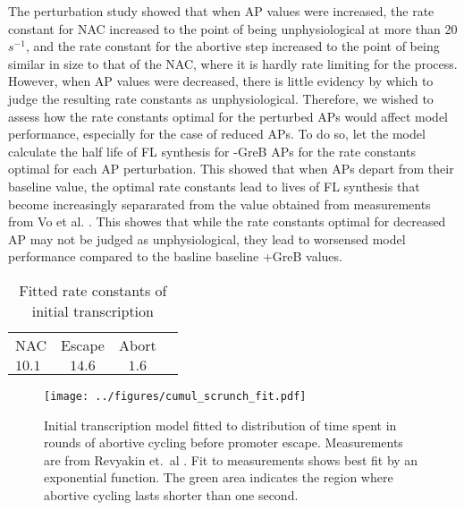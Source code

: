 The perturbation study showed that when AP values were increased,  the rate
constant for NAC increased to the point of being unphysiological at more than
20 $s^{-1}$, and the rate constant for the abortive step increased to the
point of being similar in size to that of the NAC, where it is hardly rate
limiting for the process. However, when AP values were decreased, there is
little evidency by which to judge the resulting rate constants as
unphysiological. Therefore, we wished to assess how the rate constants optimal
for the perturbed APs would affect model performance, especially for the case
of reduced APs. To do so, let the model calculate the half life of FL
synthesis for -GreB APs for the rate constants optimal for each AP
perturbation. This showed that when APs depart from their baseline value, the
optimal rate constants lead to lives of FL synthesis that become increasingly
separarated from the value obtained from measurements from Vo et al.
\cite{vo_vitro_2003-1}. This showes that while the rate constants optimal for
decreased AP may not be judged as unphysiological, they lead to worsensed
model performance compared to the basline baseline +GreB values.

\begin{table}
  \label{tab:param_fit_revyakin}
  \caption{Fitted rate constants of initial transcription}
  \begin{center}
    \begin{tabular}{lccc}
       \toprule
       NAC & Escape & Abort \\
       $10.1$ & $14.6$ & $1.6$ \\
    \end{tabular}
  \end{center}
\end{table}

\begin{figure}
    \begin{center}
      \texttt{[image: ../figures/cumul\_scrunch\_fit.pdf]}
    \end{center}
    \caption{Initial transcription model fitted to distribution of time spent
      in rounds of abortive cycling before promoter escape. Measurements are
      from Revyakin et.\ al \cite{revyakin_abortive_2006}. Fit to measurements
      shows best fit by an exponential function. The green area indicates the
      region where abortive cycling lasts shorter than one second.}
\label{fig:revyakin_fit}
\end{figure}


